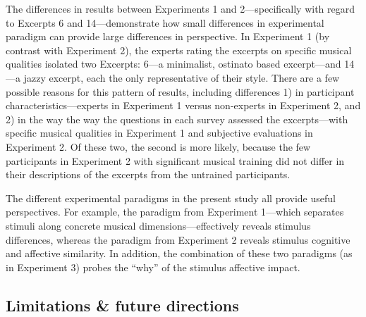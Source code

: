 \documentclass[
  english,
  man]{apa6}
\begin{document}
The differences in results between Experiments 1 and 2---specifically with regard to Excerpts 6 and 14---demonstrate how small differences in experimental paradigm can provide large differences in perspective. In Experiment 1 (by contrast with Experiment 2), the experts rating the excerpts on specific musical qualities isolated two Excerpts: 6---a minimalist, ostinato based excerpt---and 14---a jazzy excerpt, each the only representative of their style. There are a few possible reasons for this pattern of results, including differences 1) in participant characteristics---experts in Experiment 1 versus non-experts in Experiment 2, and 2) in the way the way the questions in each survey assessed the excerpts---with specific musical qualities in Experiment 1 and subjective evaluations in Experiment 2. Of these two, the second is more likely, because the few participants in Experiment 2 with significant musical training did not differ in their descriptions of the excerpts from the untrained participants.

The different experimental paradigms in the present study all provide useful perspectives. For example, the paradigm from Experiment 1---which separates stimuli along concrete musical dimensions---effectively reveals stimulus differences, whereas the paradigm from Experiment 2 reveals stimulus cognitive and affective similarity. In addition, the combination of these two paradigms (as in Experiment 3) probes the ``why'' of the stimulus affective impact.

\hypertarget{limitations-future-directions}{%
\subsection{Limitations \& future directions}\label{limitations-future-directions}}
\end{document}
